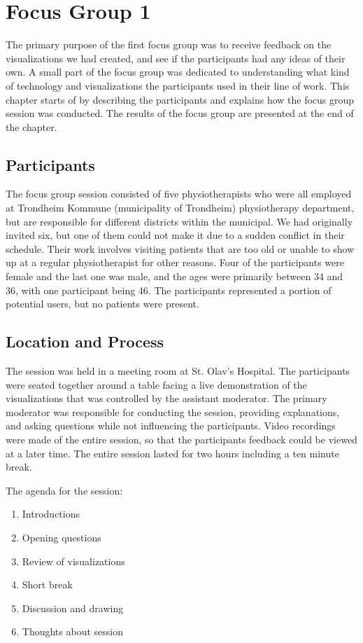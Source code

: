 \chapter{Focus Group 1}
\label{ch:focusGroup1}
The primary purpose of the first focus group was to receive feedback on the visualizations we had created, and see if the participants had any ideas of their own. A small part of the focus group was dedicated to understanding what kind of technology and visualizations the participants used in their line of work. This chapter starts of by describing the participants and explains how the focus group session was conducted. The results of the focus group are presented at the end of the chapter.

\section{Participants}
The focus group session consisted of five physiotherapists who were all employed at Trondheim Kommune (municipality of Trondheim) physiotherapy department, but are responsible for different districts within the municipal. We had originally invited six, but one of them could not make it due to a sudden conflict in their schedule. Their work involves visiting patients that are too old or unable to show up at a regular physiotherapist for other reasons. Four of the participants were female and the last one was male, and the ages were primarily between 34 and 36, with one participant being 46. The participants represented a portion of potential users, but no patients were present.


\section{Location and Process}
The session was held in a meeting room at St. Olav's Hospital. The participants were seated together around a table facing a live demonstration of the visualizations that was controlled by the assistant moderator. The primary moderator was responsible for conducting the session, providing explanations, and asking questions while not influencing the participants. Video recordings were made of the entire session, so that the participants feedback could be viewed at a later time. The entire session lasted for two hours including a ten minute break.

The agenda for the session:
\vspace{-8mm}
\begin{enumerate}[itemsep=0cm, parsep=0cm]
  \item Introductions
  \item Opening questions
  \item Review of visualizations
  \item Short break
  \item Discussion and drawing
  \item Thoughts about session
\end{enumerate}

